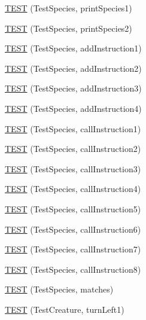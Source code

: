 \begin{DoxyCompactItemize}
\item 
\hyperlink{TestDarwin_8c_09_09_a939fa546777b0498e5198cb9bdc99ecc}{T\-E\-S\-T} (Test\-Species, print\-Species1)
\item 
\hyperlink{TestDarwin_8c_09_09_a5163d1302bbc232c3c53bcdc158417d5}{T\-E\-S\-T} (Test\-Species, print\-Species2)
\item 
\hyperlink{TestDarwin_8c_09_09_ac94945e44c7089b891d501a73457875d}{T\-E\-S\-T} (Test\-Species, add\-Instruction1)
\item 
\hyperlink{TestDarwin_8c_09_09_a22075f349674510a6a48136c6b827b61}{T\-E\-S\-T} (Test\-Species, add\-Instruction2)
\item 
\hyperlink{TestDarwin_8c_09_09_a6db427fcf10c151c2ceccd04c09287e6}{T\-E\-S\-T} (Test\-Species, add\-Instruction3)
\item 
\hyperlink{TestDarwin_8c_09_09_ae152bab0285a754c6b055c17102066c7}{T\-E\-S\-T} (Test\-Species, add\-Instruction4)
\item 
\hyperlink{TestDarwin_8c_09_09_a0c01c95ba0579b61ae4cadf55198e449}{T\-E\-S\-T} (Test\-Species, call\-Instruction1)
\item 
\hyperlink{TestDarwin_8c_09_09_a1c4fb0d82b98d489b24c65bd9d20cbdc}{T\-E\-S\-T} (Test\-Species, call\-Instruction2)
\item 
\hyperlink{TestDarwin_8c_09_09_abb613350df56e13e47495ce91c0c91f4}{T\-E\-S\-T} (Test\-Species, call\-Instruction3)
\item 
\hyperlink{TestDarwin_8c_09_09_a5f3258c386e101e0cd559bcaa2eb3703}{T\-E\-S\-T} (Test\-Species, call\-Instruction4)
\item 
\hyperlink{TestDarwin_8c_09_09_a2396e17b19d92d2addf0f6bb5f30f93a}{T\-E\-S\-T} (Test\-Species, call\-Instruction5)
\item 
\hyperlink{TestDarwin_8c_09_09_a3dcfc358597b03b375c0f2eecc9c82a8}{T\-E\-S\-T} (Test\-Species, call\-Instruction6)
\item 
\hyperlink{TestDarwin_8c_09_09_a6ef625a2ed2351be9bed4ba26c231f45}{T\-E\-S\-T} (Test\-Species, call\-Instruction7)
\item 
\hyperlink{TestDarwin_8c_09_09_a795f9928a094741d3bb1e1c8b8eb801d}{T\-E\-S\-T} (Test\-Species, call\-Instruction8)
\item 
\hyperlink{TestDarwin_8c_09_09_a1a8cfbe30bf13bb71736ea215cdee03f}{T\-E\-S\-T} (Test\-Species, matches)
\item 
\hyperlink{TestDarwin_8c_09_09_a11a216bf82af9e4edc64159fad0381ee}{T\-E\-S\-T} (Test\-Creature, turn\-Left1)

\end{DoxyCompactItemize}
